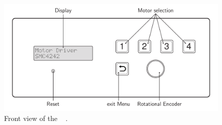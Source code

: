 \begin{figure}[h]
  \centering
  \includegraphics[width=12cm]{grafiken/SMCxxx2-0006_3_daub_text.pdf}
  \caption[Front view of the \productNumber ~\productName.]{Front view of
  the \productNumber ~    \productName.}
  \label{frontpanel}
\end{figure}






\newpage